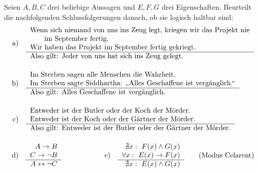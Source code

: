\begin{aufg}
    Seien $A,B,C$ drei beliebige Aussagen und $E,F,G$ drei Eigenschaften. Beurteilt die nachfolgenden Schlussfolgerungen danach, ob sie logisch haltbar sind:
    \begin{align*}
        \text{a)}\quad &\begin{tabular}{l}
            Wenn sich niemand von uns ins Zeug legt, kriegen wir das Projekt nie \\
            \qquad im September fertig. \\
            Wir haben das Projekt im September fertig gekriegt. \\ \hline
            Also gilt: Jeder von uns hat sich ins Zeug gelegt.
        \end{tabular} \\[1em]
        \text{b)}\quad &\begin{tabular}{l}
            Im Sterben sagen alle Menschen die Wahrheit. \\
            Im Sterben sagte Siddhartha: „Alles Geschaffene ist vergänglich.“ \\ \hline
            Also gilt: Alles Geschaffene ist vergänglich.
        \end{tabular} \\[1em]
        \text{c)}\quad &\begin{tabular}{l}
            Entweder ist der Butler oder der Koch der Mörder. \\
            Entweder ist der Koch oder der Gärtner der Mörder. \\ \hline
            Also gilt: Entweder ist der Butler oder der Gärtner der Mörder.
        \end{tabular} \\[1em]
        \text{d)}\quad &\begin{tabular}{r}
            $A\to B$ \\
            $C\to \neg B$ \\ \hline
            $A\leftrightarrow \neg C$
        \end{tabular} \qquad\qquad\qquad \text{e)}\quad \begin{tabular}{r}
            $\nexists x:\ F(x)\land G(x)$ \\
            $\forall x:\ E(x)\to F(x)$ \\ \hline
            $\nexists x:\ E(x)\land G(x)$
        \end{tabular} \qquad (\text{Modus Celarent}) \\[1em]

\end{align*}
\end{aufg}
